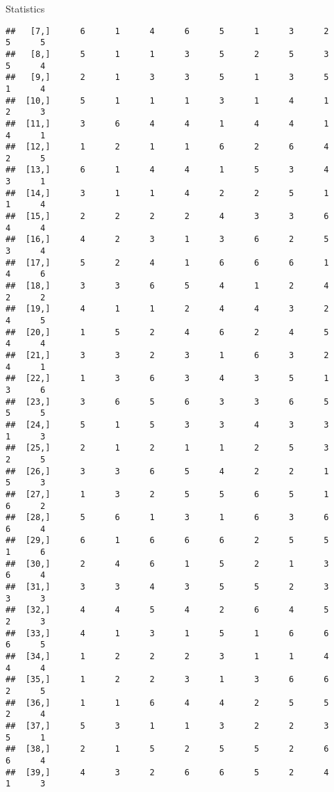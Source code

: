 \documentclass[
  ignorenonframetext,
]{beamer}
\begin{document}
\begin{frame}[fragile]{Statistics}
\begin{verbatim}
##   [7,]      6      1      4      6      5      1      3      2      5      5
##   [8,]      5      1      1      3      5      2      5      3      5      4
##   [9,]      2      1      3      3      5      1      3      5      1      4
##  [10,]      5      1      1      1      3      1      4      1      2      3
##  [11,]      3      6      4      4      1      4      4      1      4      1
##  [12,]      1      2      1      1      6      2      6      4      2      5
##  [13,]      6      1      4      4      1      5      3      4      3      1
##  [14,]      3      1      1      4      2      2      5      1      1      4
##  [15,]      2      2      2      2      4      3      3      6      4      4
##  [16,]      4      2      3      1      3      6      2      5      3      4
##  [17,]      5      2      4      1      6      6      6      1      4      6
##  [18,]      3      3      6      5      4      1      2      4      2      2
##  [19,]      4      1      1      2      4      4      3      2      4      5
##  [20,]      1      5      2      4      6      2      4      5      4      4
##  [21,]      3      3      2      3      1      6      3      2      4      1
##  [22,]      1      3      6      3      4      3      5      1      3      6
##  [23,]      3      6      5      6      3      3      6      5      5      5
##  [24,]      5      1      5      3      3      4      3      3      1      3
##  [25,]      2      1      2      1      1      2      5      3      2      5
##  [26,]      3      3      6      5      4      2      2      1      5      3
##  [27,]      1      3      2      5      5      6      5      1      6      2
##  [28,]      5      6      1      3      1      6      3      6      6      4
##  [29,]      6      1      6      6      6      2      5      5      1      6
##  [30,]      2      4      6      1      5      2      1      3      6      4
##  [31,]      3      3      4      3      5      5      2      3      3      3
##  [32,]      4      4      5      4      2      6      4      5      2      3
##  [33,]      4      1      3      1      5      1      6      6      6      5
##  [34,]      1      2      2      2      3      1      1      4      4      4
##  [35,]      1      2      2      3      1      3      6      6      2      5
##  [36,]      1      1      6      4      4      2      5      5      2      4
##  [37,]      5      3      1      1      3      2      2      3      5      1
##  [38,]      2      1      5      2      5      5      2      6      6      4
##  [39,]      4      3      2      6      6      5      2      4      1      3

\end{verbatim}
\end{frame}
\end{document}
